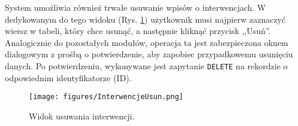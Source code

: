 System umożliwia również trwałe usuwanie wpisów o interwencjach. W dedykowanym do tego widoku (Rys. \ref{fig:interwencje_usuniecie_widok}) użytkownik musi najpierw zaznaczyć wiersz w tabeli, który chce usunąć, a następnie kliknąć przycisk ,,Usuń''. Analogicznie do pozostałych modułów, operacja ta jest zabezpieczona oknem dialogowym z prośbą o potwierdzenie, aby zapobiec przypadkowemu usunięciu danych. Po potwierdzeniu, wykonywane jest zapytanie \texttt{DELETE} na rekordzie o odpowiednim identyfikatorze (ID).

\begin{figure}[H]
    \centering
    \texttt{[image: figures/InterwencjeUsun.png]}
    \caption{Widok usuwania interwencji.}
    \label{fig:interwencje_usuniecie_widok}
\end{figure}

